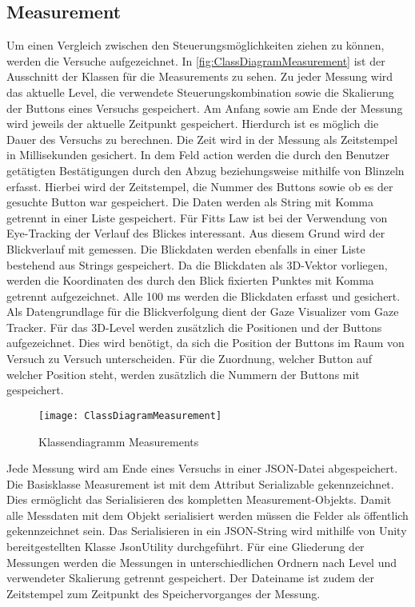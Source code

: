 \subsection{Measurement}
Um einen Vergleich zwischen den Steuerungsmöglichkeiten ziehen zu können, werden die Versuche aufgezeichnet. In \autoref{fig:ClassDiagramMeasurement} ist der Ausschnitt der Klassen für die Measurements zu sehen. Zu jeder Messung wird das aktuelle Level, die verwendete Steuerungskombination sowie die Skalierung der Buttons eines Versuchs gespeichert. Am Anfang sowie am Ende der Messung wird jeweils der aktuelle Zeitpunkt gespeichert. Hierdurch ist es möglich die Dauer des Versuchs zu berechnen. Die Zeit wird in der Messung als Zeitstempel in Millisekunden gesichert. In dem Feld action werden die durch den Benutzer getätigten Bestätigungen durch den Abzug beziehungsweise mithilfe von Blinzeln erfasst. Hierbei wird der Zeitstempel, die Nummer des Buttons sowie ob es der gesuchte Button war gespeichert.  Die Daten werden als String mit Komma getrennt in einer Liste gespeichert. Für Fitts Law ist bei der Verwendung von Eye-Tracking der Verlauf des Blickes interessant. Aus diesem Grund wird der Blickverlauf mit gemessen. Die Blickdaten werden ebenfalls in einer Liste bestehend aus Strings gespeichert. Da die Blickdaten als 3D-Vektor vorliegen, werden die Koordinaten des durch den Blick fixierten Punktes mit Komma getrennt aufgezeichnet. Alle 100 ms werden die Blickdaten erfasst und gesichert. Als Datengrundlage für die Blickverfolgung dient der Gaze Visualizer vom Gaze Tracker. Für das 3D-Level werden zusätzlich die Positionen und der Buttons aufgezeichnet. Dies wird benötigt, da sich die Position der Buttons im Raum von Versuch zu Versuch unterscheiden. Für die Zuordnung, welcher Button auf welcher Position steht, werden zusätzlich die Nummern der Buttons mit gespeichert.

\begin{figure}[!htbp]
	\centering
	\texttt{[image: ClassDiagramMeasurement]}
	\caption[Klassendiagramm Measurements]{Klassendiagramm Measurements}
	\label{fig:ClassDiagramMeasurement}
\end{figure}

Jede Messung wird am Ende eines Versuchs in einer JSON-Datei abgespeichert. Die Basisklasse Measurement ist mit dem Attribut Serializable gekennzeichnet. Dies ermöglicht das Serialisieren des kompletten Measurement-Objekts. Damit alle Messdaten mit dem Objekt serialisiert werden müssen die Felder als öffentlich gekennzeichnet sein. Das Serialisieren in ein JSON-String wird mithilfe von Unity bereitgestellten Klasse JsonUtility durchgeführt. Für eine Gliederung der Messungen werden die Messungen in unterschiedlichen Ordnern nach Level und verwendeter Skalierung getrennt gespeichert. Der Dateiname ist zudem der Zeitstempel zum Zeitpunkt des Speichervorganges der Messung.